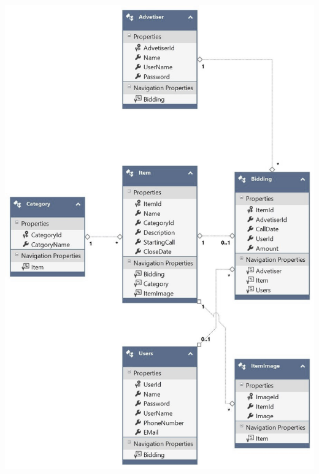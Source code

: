 \documentclass[12pt,a4paper]{article}
\begin{document}
\includegraphics[scale=1.0]{entity_connect.jpg}
\end{document}
